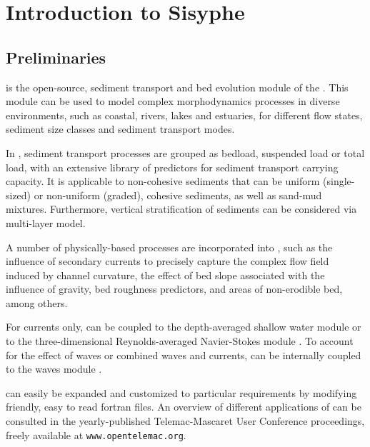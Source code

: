 \chapter[Introduction]{Introduction to Sisyphe}

\section{Preliminaries}
\sisyphe{} is the open-source, sediment transport and bed evolution module of the \telemacsystem{}. This module can be used to model complex morphodynamics processes in diverse environments, such as
coastal, rivers, lakes and estuaries, for different flow states, sediment size classes and sediment
transport modes.

In \sisyphe{}, sediment transport processes are grouped as bedload, suspended load or total load,
with an extensive library of predictors for sediment transport carrying capacity. It is applicable to non-cohesive sediments that can be uniform (single-sized) or non-uniform
(graded), cohesive sediments, as well as sand-mud
mixtures. Furthermore, vertical stratification of sediments can be considered via multi-layer model.

A number of physically-based processes are incorporated into \sisyphe{}, such as the influence of
secondary currents to precisely capture the complex flow field induced by channel curvature, the
effect of bed slope associated with the influence of gravity, bed roughness predictors, and areas of
non-erodible bed, among others.

For currents only, \sisyphe{} can be coupled to the depth-averaged shallow water module
 or to the three-dimensional Reynolds-averaged Navier-Stokes module .
To account for the effect of waves or combined waves and currents, \sisyphe can be internally coupled
to the waves module \tomawac{}.

\sisyphe{} can easily be expanded and customized to particular requirements by modifying friendly,
easy to read fortran files. An overview of different applications of \sisyphe{} can be consulted in the yearly-published Telemac-Mascaret User Conference proceedings, freely available at \texttt{www.opentelemac.org}.

